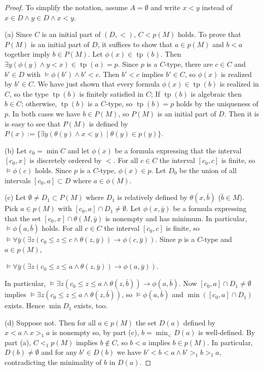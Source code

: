\documentclass[10pt,a4paper]{amsart}
\theoremstyle{definition}
\DeclareMathOperator{\tp}{tp}
\begin{document}
\begin{proof}To simplify the notation, assume $A=\emptyset$ and  write $x<y$ instead of $x\in D\land y\in D\land x<y$. 

(a) Since $C$ is an initial part of $(D,<)$,    $C<p(M)$ holds. 
To prove that $P(M)$ is an initial part of $D$, it suffices to show that $a\in p(M)$ and $b< a$ together imply $b\in P(M)$. Let $\phi(x)\in \tp(b)$. 
Then  $\exists y(\phi(y)\land y< x)\in\tp(a)=p$. Since $p$ is   a $C$-type, there are $c\in C$ and $b'\in D$ with $\models\phi(b')\land b'< c$.
Then $b'< c$ implies $b'\in C$, so   $\phi(x)$ is realized by $b'\in C$. We have just shown that every formula $\phi(x)\in \tp(b)$ is realized in $C$, so the type $\tp(b)$ is finitely satisfied in $C$; 
If $\tp(b)$ is algebraic  then $b\in C$; otherwise, $\tp (b)$ is a $C$-type, so $\tp(b)=p$ holds by the uniqueness of $p$.
In both cases we have $b\in P(M)$, so $P(M)$ is an initial part of $D$. Then it is is easy to see that $P(M)$ is defined by  $P(x):=\{\exists y(\theta(y) \land   x<y)\mid \theta(y)\in p(y)\}$. 

\smallskip
(b) Let $c_0=\min C$ and let $\phi(x)$ be a formula expressing that the interval $[c_0,x]$ is discretely ordered by $<$.  For all $c\in C$ the interval $[c_0,c]$ is finite, so $\models  \phi(c)$ holds. Since $p$ is a $C$-type, $\phi(x)\in p$. Let $D_0$ be the union of all intervals $[c_0,a]\subset D$ where $a\in\phi(M)$.  

\smallskip
(c) Let $\emptyset\neq D_1\subset P(M)$  where $D_1$ is relatively defined by $\theta(x,\bar b)$ ($\bar b\in M$). Pick $a\in p(M)$ with $[c_0,a]\cap D_1\neq\emptyset$.  Let $\phi(x,\bar y)$ be a formula expressing that the set
$[c_0,x]\cap\theta(M,\bar y)$ is nonempty and has minimum. 
In particular, $\models\phi(a,\bar b)$ holds. For all $c\in C$ the interval $[c_0,c]$ is finite, so $\models \forall \bar y \left(\exists z(c_0\leq z\leq c\land \theta(z,\bar y))\rightarrow \phi(c,\bar y)\right)$. Since $p$ is a $C$-type and $a\in p(M)$, 
\begin{center} 
$\models \forall \bar y \left(\exists z(c_0\leq z\leq a\land \theta(z,\bar y))\rightarrow \phi(a,\bar y)\right)$.  
\end{center}
In particular,   $\models  \exists z(c_0\leq z\leq a\land \theta(z,\bar b))\rightarrow \phi(a,\bar b)$.  Now  $[c_0,a]\cap D_1\neq \emptyset$ implies $\models  \exists z(c_0\leq z\leq a\land \theta(z,\bar b))$, so $\models\phi(a,\bar b)$ and $\min ([c_0,a]\cap D_1)$ exists. Hence $\min D_1$ exists, too.

\smallskip
(d) Suppose not. Then for all $a\in p(M)$ the set $D(a)$ defined by $x<a\land x>_1 a$ is nonempty so, by part (c), $b=\min_{<} D(a)$ is well-defined. By part (a), $C<_1p(M)$ implies $b\notin C$, so  $b<a$ implies $b\in p(M)$. In particular, $D(b)\neq\emptyset$ and for any $b'\in D(b)$ we have $b'<b<a\land b'>_1b>_1 a$, contradicting the minimality of $b$ in $D(a)$. 
\end{proof}
\end{document}
